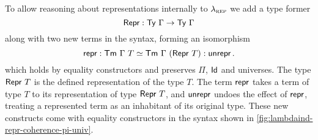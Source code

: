 To allow reasoning about representations internally to $\lambda_{\textsc{rep}}$ we add a
type former
\begin{equation}\label{eq:repr-ty}
	\textsf{Repr}{} : \textsf{Ty}\ \Gamma \to \textsf{Ty}\ \Gamma
\end{equation}
along with two new terms in the syntax, forming an isomorphism
\begin{equation}\label{eq:repr-iso}
	\textsf{repr}{} : \textsf{Tm}\ \Gamma\ T \simeq \textsf{Tm}\ \Gamma\ (\textsf{Repr}\ T) : \textsf{unrepr}{} \,.
\end{equation}
which holds by equality constructors and preserves $\Pi$, $\textsf{Id}$ and
universes. The type $\MRepr\ T$ is the defined representation of the type $T$.
The term $\textsf{repr}{}$ takes a term of type $T$ to its representation of type
$\MRepr\ T$, and $\textsf{unrepr}{}$ undoes the effect of $\textsf{repr}{}$, treating a
represented term as an inhabitant of its original type. These new constructs
come with equality constructors in the syntax
shown in \cref{fig:lambdaind-repr-coherence-pi-univ}.
